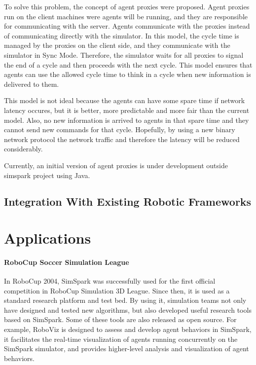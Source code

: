 \documentclass{llncs}
\begin{document}
To solve this problem, the concept of agent proxies were proposed. Agent proxies
run on the client machines were agents will be running, and they are responsible for
communicating with the server. Agents communicate with the proxies instead of 
communicating directly with the simulator. In this model, the cycle time is managed
by the proxies on the client side, and they communicate with the simulator in Sync Mode.
Therefore, the simulator waits for all proxies to signal the end of a cycle and 
then proceeds with the next cycle. This model ensures that agents can use the allowed
cycle time to think in a cycle when new information is delivered to them. 

This model is not ideal because the agents can have some spare time if network latency
occures, but it is better, more predictable and more fair than the current model. Also,
no new information is arrived to agents in that spare time and they cannot send new 
commands for that cycle. Hopefully, by using a new binary network protocol the network 
traffic and therefore the latency will be reduced considerably.

Currently, an initial version of agent proxies is under development outside simspark
project using Java.

\subsection{Integration With Existing Robotic Frameworks}


\section{Applications}
\label{s:application}
\paragraph{RoboCup Soccer Simulation League}
In RoboCup 2004, SimSpark was successfully used for the first official competition in RoboCup Simulation 3D League. Since then, it is used as a standard research platform and test bed. By using it, simulation teams not only have designed and tested new algorithms, but also developed useful research tools based on SimSpark. Some of these tools are also released as open source.
For example, RoboViz\cite{Stoecker2012} is designed to assess and develop agent behaviors in SimSpark,
it facilitates the real-time visualization of agents running concurrently on the SimSpark simulator,
and provides higher-level analysis and visualization of agent behaviors.
\end{document}
